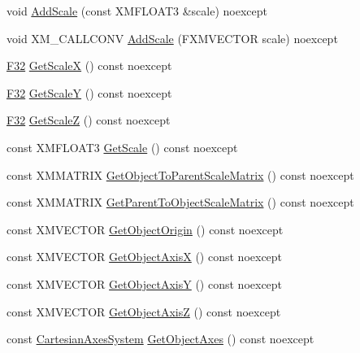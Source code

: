 \begin{DoxyCompactItemize}
\item 
void \hyperlink{structmage_1_1_transform_aea10d09564f098ed72e08e6d5446c1cb}{Add\+Scale} (const X\+M\+F\+L\+O\+A\+T3 \&scale) noexcept
\item 
void X\+M\+\_\+\+C\+A\+L\+L\+C\+O\+NV \hyperlink{structmage_1_1_transform_a2e424087adc2332bb254dc6162202866}{Add\+Scale} (F\+X\+M\+V\+E\+C\+T\+OR scale) noexcept
\item 
\hyperlink{namespacemage_aa97e833b45f06d60a0a9c4fc22ae02c0}{F32} \hyperlink{structmage_1_1_transform_a86eff370d6cb37a7aa5f7d78d4cf3cf4}{Get\+ScaleX} () const noexcept
\item 
\hyperlink{namespacemage_aa97e833b45f06d60a0a9c4fc22ae02c0}{F32} \hyperlink{structmage_1_1_transform_a17bd579657e31fbdc1eacec0836140c5}{Get\+ScaleY} () const noexcept
\item 
\hyperlink{namespacemage_aa97e833b45f06d60a0a9c4fc22ae02c0}{F32} \hyperlink{structmage_1_1_transform_aa7ba1aa16161ec656b2828c2433f6dbd}{Get\+ScaleZ} () const noexcept
\item 
const X\+M\+F\+L\+O\+A\+T3 \hyperlink{structmage_1_1_transform_a0f63b2450b9ecb066bf4e34707d9148e}{Get\+Scale} () const noexcept
\item 
const X\+M\+M\+A\+T\+R\+IX \hyperlink{structmage_1_1_transform_a27c7ed867751be11143d6eb9b0578d52}{Get\+Object\+To\+Parent\+Scale\+Matrix} () const noexcept
\item 
const X\+M\+M\+A\+T\+R\+IX \hyperlink{structmage_1_1_transform_ab6da631ec399eb3b88b67e438dd0c002}{Get\+Parent\+To\+Object\+Scale\+Matrix} () const noexcept
\item 
const X\+M\+V\+E\+C\+T\+OR \hyperlink{structmage_1_1_transform_a138b6649becd0f12b36a7db44e46ce31}{Get\+Object\+Origin} () const noexcept
\item 
const X\+M\+V\+E\+C\+T\+OR \hyperlink{structmage_1_1_transform_a9f1bb95655238cd91ceae487d49ae6c2}{Get\+Object\+AxisX} () const noexcept
\item 
const X\+M\+V\+E\+C\+T\+OR \hyperlink{structmage_1_1_transform_a8638ea8b26dcd32508c267151c3adcfe}{Get\+Object\+AxisY} () const noexcept
\item 
const X\+M\+V\+E\+C\+T\+OR \hyperlink{structmage_1_1_transform_a0f1249835596278a430c63d74a86906a}{Get\+Object\+AxisZ} () const noexcept
\item 
const \hyperlink{structmage_1_1_cartesian_axes_system}{Cartesian\+Axes\+System} \hyperlink{structmage_1_1_transform_a71f590385c153fd0a9dd15af4b8a4bc7}{Get\+Object\+Axes} () const noexcept
\item 

\end{DoxyCompactItemize}
